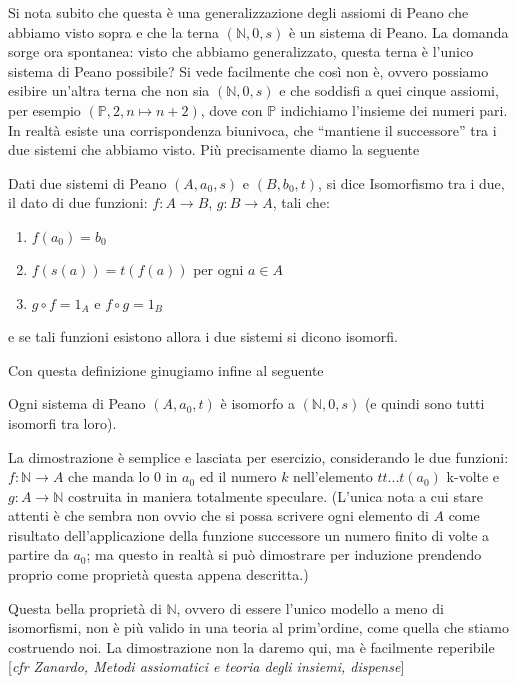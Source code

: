 Si nota subito che questa \`e una generalizzazione degli assiomi di Peano che abbiamo visto sopra e che la terna $(\mathbb{N},0,s)$ \`e un sistema di Peano.
La domanda sorge ora spontanea: visto che abbiamo generalizzato, questa terna \`e l'unico sistema di Peano possibile?
Si vede facilmente che cos\`i non \`e, ovvero possiamo esibire un'altra terna che non sia $(\mathbb{N},0,s)$ e che soddisfi a quei cinque assiomi, per esempio $(\mathbb{P},2,n\mapsto n+2)$, dove con $ \mathbb{P} $ indichiamo l'insieme dei numeri pari.
In realt\`a esiste una corrispondenza biunivoca, che ``mantiene il successore'' tra i due sistemi che abbiamo visto.
Pi\`u precisamente diamo la seguente 
\begin{defi}
Dati due sistemi di Peano $ (A,a_0,s) $ e $ (B,b_0,t) $, si dice Isomorfismo tra i due, il dato di due funzioni:
$ f:A\rightarrow B $, $ g:B\rightarrow A $, tali che:
\begin{enumerate}
\item $ f(a_0)=b_0 $
\item $ f(s(a))=t(f(a)) $ per ogni $ a\in A $
\item $ g\circ f=1_A $ e $ f\circ g=1_B $
\end{enumerate}
e se tali funzioni esistono allora i due sistemi si dicono isomorfi.
\end{defi}

Con questa definizione ginugiamo infine al seguente 
\begin{thm}
Ogni sistema di Peano $ (A,a_0,t) $ \`e isomorfo a $ (\mathbb{N},0,s) $ (e quindi sono tutti isomorfi tra loro).
\end{thm}

La dimostrazione \`e semplice e lasciata per esercizio, considerando le due funzioni:
$ f:\mathbb{N}\rightarrow A $ che manda lo 0 in $ a_0 $ ed il numero $ k $ nell'elemento $ tt...t(a_0) $ k-volte e
$ g:A\rightarrow \mathbb{N} $ costruita in maniera totalmente speculare. (L'unica nota a cui stare attenti \`e che sembra non ovvio che si possa scrivere ogni elemento di $ A $ come risultato dell'applicazione della funzione successore un numero finito di volte a partire da $ a_0 $; ma questo in realt\`a si pu\`o dimostrare per induzione prendendo proprio come propriet\`a questa appena descritta.)

\vspace{0.3cm}
Questa bella propriet\`a di $ \mathbb{N} $, ovvero di essere l'unico modello a meno di isomorfismi, non \`e pi\`u valido in una teoria al prim'ordine, come quella che stiamo costruendo noi. La dimostrazione non la daremo qui, ma \`e facilmente reperibile [\textit{cfr Zanardo, Metodi assiomatici e teoria degli insiemi, dispense}]

